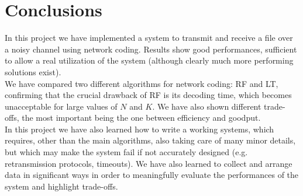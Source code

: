 \section{Conclusions}
In this project we have implemented a system to transmit and receive a file over a noisy channel using network coding. Results show good performances, sufficient to allow a real utilization of the system (although clearly much more performing solutions exist).\\
We have compared two different algorithms for network coding: RF and LT, confirming that the crucial drawback of RF is its decoding time, which becomes unacceptable for large values of $N$ and $K$. We have also shown different trade-offs, the most important being the one between efficiency and goodput. \\
In this project we have also learned how to write a working systems, which requires, other than the main algorithms, also taking care of many minor details, but which may make the system fail if not accurately designed (e.g. retransmission protocols, timeouts). We have also learned to collect and arrange data in significant ways in order to meaningfully evaluate the performances of the system and highlight trade-offs.

